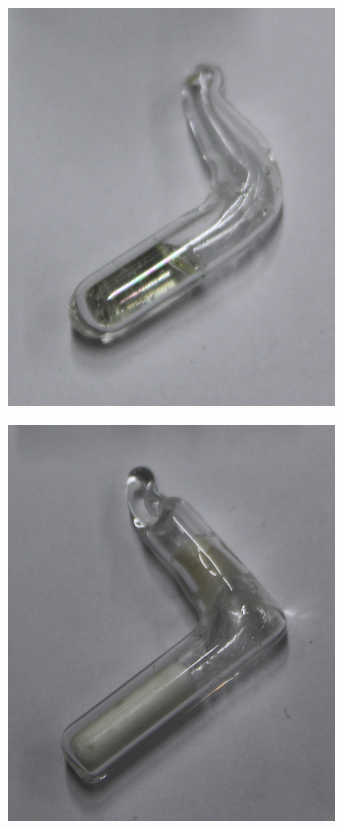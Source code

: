 \begin{figure}[H]
	\centering
	\begin{subfigure}{.24\textwidth}
		\centering
		\includegraphics[width=0.95\textwidth]{graphics/proben/CRN zuern.jpg}
		\caption{ }
		\label{fig:exp:probe_a}
	\end{subfigure}%
	\begin{subfigure}{.24\textwidth}
		\centering
		\includegraphics[width=0.95\textwidth]{graphics/proben/CRN alt.jpg}

\end{subfigure}
\end{figure}
